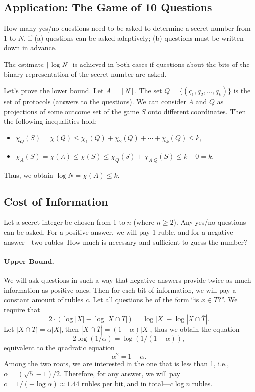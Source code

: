 \documentclass[12pt,sans]{article}
\newcommand{\seqn}[2]{{#1}_1,{#1}_2,\dotsc,{#1}_{#2}}
\theoremstyle{definition}
\theoremstyle{plain}
\theoremstyle{remark}
\begin{document}
\subsection{Application: The Game of 10 Questions}
How many yes/no questions need to be asked to determine a secret number from 1 to \(N\), if (a) questions can be asked adaptively; (b) questions must be written down in advance.

The estimate \(\lceil\log N\rceil\) is achieved in both cases if questions about the bits of the binary representation of the secret number are asked.

Let's prove the lower bound. Let \(A=[N]\). The set \(Q = \{(\seqn{q}{k})\}\) is the set of protocols (answers to the questions). We can consider \(A\) and \(Q\) as projections of some outcome set of the game \(S\) onto different coordinates. Then the following inequalities hold:
\begin{itemize}
    \item \( \chi_Q(S) = \chi(Q) \le \chi_1(Q) + \chi_2(Q) + \dotsb + \chi_k(Q) \le k, \)
    \item \( \chi_A(S) = \chi(A) \le \chi(S) \le \chi_Q(S) + \chi_{A|Q}(S) \le k + 0 = k. \)
\end{itemize}
Thus, we obtain \(\log N = \chi(A) \le k\).

\subsection{Cost of Information}
Let a secret integer be chosen from 1 to \(n\) (where \(n \ge 2\)).
Any yes/no questions can be asked. For a positive answer, we will pay 1 ruble, and for a negative answer—two rubles. How much is necessary and sufficient to guess the number?

\paragraph{Upper Bound.} We will ask questions in such a way that negative answers provide twice as much information as positive ones. Then for each bit of information, we will pay a constant amount of rubles \(c\). Let all questions be of the form “is \(x \in T\)?”. We require that
\[2\cdot(\log |X| - \log|X \cap T|) = \log |X| - \log|X\cap\overline T|.\]
Let \(|X \cap T| = \alpha|X|\), then \(|X\cap\overline T| = (1 - \alpha)|X|\),
thus we obtain the equation
\[2\log (1/\alpha) = \log (1/(1-\alpha)),\]
equivalent to the quadratic equation
\[\alpha^2 = 1 - \alpha.\] Among the two roots, we are interested in the one that is less than 1, i.e., \(\alpha=(\sqrt 5 - 1) / 2\). Therefore, for any answer, we will pay \(c = 1/(-\log \alpha)\approx 1.44\) rubles per bit, and in total—\(c\log n\) rubles.
\end{document}

